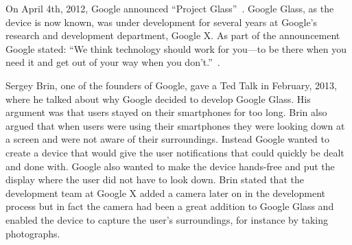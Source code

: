 %
%
%
%
%
%
%
%
On April 4th, 2012, Google announced ``Project Glass''~\cite{GoogleGlassConcept}. Google Glass, as the device is now known, was under development for several years at Google's research and development department, Google X. As part of the announcement Google stated:  ``We think technology should work for you---to be there when you need it and get out of your way when you don't.''~\cite{GoogleGlassAnnouncement}.

Sergey Brin, one of the founders of Google, gave a Ted Talk in February, 2013,~\cite{tedtalkWhyGlass} where he talked about why Google decided to develop Google Glass. His argument was that users stayed on their smartphones for too long. Brin also argued that when users were using their smartphones they were looking down at a screen and were not aware of their surroundings. Instead Google wanted to create a device that would give the user notifications that could quickly be dealt and done with. Google also wanted to make the device hands-free and put the display where the user did not have to look down. Brin stated that the development team at Google X added a camera later on in the development process but in fact the camera had been a great addition to Google Glass and enabled the device to capture the user's surroundings, for instance by taking photographs.

